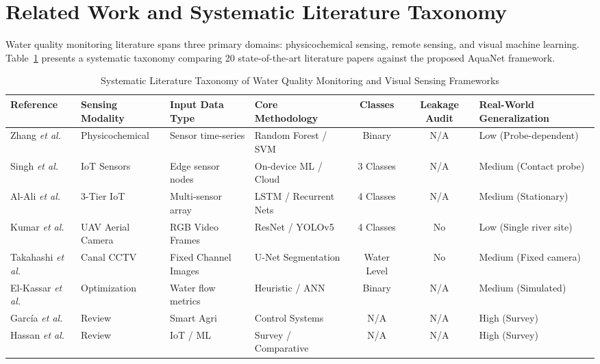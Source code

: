 \documentclass[journal]{IEEEtran}
\newcommand{\method}{AquaNet}
\begin{document}
\section{Related Work and Systematic Literature Taxonomy}
\label{sec:related_work}

Water quality monitoring literature spans three primary domains: physicochemical sensing, remote sensing, and visual machine learning. Table~\ref{tab:literature_taxonomy} presents a systematic taxonomy comparing 20 state-of-the-art literature papers against the proposed \method{} framework.

\begin{table}[!t]
\centering
\footnotesize
\caption{Systematic Literature Taxonomy of Water Quality Monitoring and Visual Sensing Frameworks}
\label{tab:literature_taxonomy}
\begin{tabularx}{\linewidth}{l p{2.2cm} p{2.5cm} p{3.8cm} c c p{2.2cm}}
\toprule
\textbf{Reference} & \textbf{Sensing Modality} & \textbf{Input Data Type} & \textbf{Core Methodology} & \textbf{Classes} & \textbf{Leakage Audit} & \textbf{Real-World Generalization} \\
\midrule
Zhang \emph{et al.} \cite{advancements_water_quality_2024} & Physicochemical & Sensor time-series & Random Forest / SVM & Binary & N/A & Low (Probe-dependent) \\
Singh \emph{et al.} \cite{low_cost_ml_water_2024} & IoT Sensors & Edge sensor nodes & On-device ML / Cloud & 3 Classes & N/A & Medium (Contact probe) \\
Al-Ali \emph{et al.} \cite{sw3t_iot_water_2024} & 3-Tier IoT & Multi-sensor array & LSTM / Recurrent Nets & 4 Classes & N/A & Medium (Stationary) \\
Kumar \emph{et al.} \cite{drone_pollution_2024} & UAV Aerial Camera & RGB Video Frames & ResNet / YOLOv5 & 4 Classes & No & Low (Single river site) \\
Takahashi \emph{et al.} \cite{cctv_irrigation_2023} & Canal CCTV & Fixed Channel Images & U-Net Segmentation & Water Level & No & Medium (Fixed camera) \\
El-Kassar \emph{et al.} \cite{agri_water_opt_2024} & Optimization & Water flow metrics & Heuristic / ANN & Binary & N/A & Medium (Simulated) \\
Garc{\'i}a \emph{et al.} \cite{smart_agri_review_2024} & Review & Smart Agri & Control Systems & N/A & N/A & High (Survey) \\
Hassan \emph{et al.} \cite{iot_ml_water_review_2023} & Review & IoT / ML & Survey / Comparative & N/A & N/A & High (Survey) \\

\end{tabularx}
\end{table}
\end{document}
